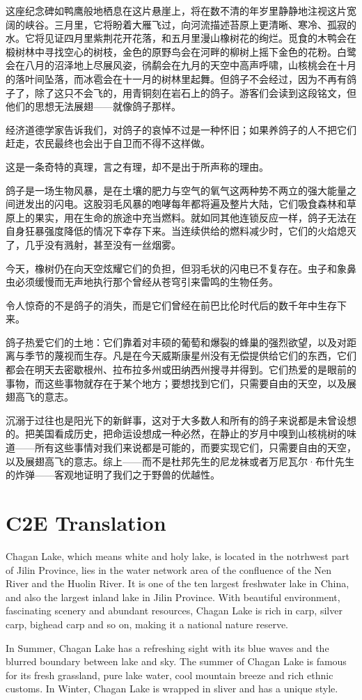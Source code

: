 \documentclass[8pt]{article}
\begin{document}
	这座纪念碑如鸭鹰般地栖息在这片悬崖上，将在数不清的年岁里静静地注视这片宽阔的峡谷。三月里，它将盼着大雁飞过，向河流描述苔原上更清晰、寒冷、孤寂的水。它将见证四月里紫荆花开花落，和五月里漫山橡树花的绚烂。觅食的木鸭会在椴树林中寻找空心的树枝，金色的原野鸟会在河畔的柳树上摇下金色的花粉。白鹭会在八月的沼泽地上尽展风姿，鸻鹬会在九月的天空中高声呼啸，山核桃会在十月的落叶间坠落，而冰雹会在十一月的树林里起舞。但鸽子不会经过，因为不再有鸽子了，除了这只不会飞的，用青铜刻在岩石上的鸽子。游客们会读到这段铭文，但他们的思想无法展翅——就像鸽子那样。

	经济道德学家告诉我们，对鸽子的哀悼不过是一种怀旧；如果养鸽子的人不把它们赶走，农民最终也会出于自卫而不得不这样做。
	
	这是一条奇特的真理，言之有理，却不是出于所声称的理由。

	鸽子是一场生物风暴，是在土壤的肥力与空气的氧气这两种势不两立的强大能量之间迸发出的闪电。这股羽毛风暴的咆哮每年都将遍及整片大陆，它们吸食森林和草原上的果实，用在生命的旅途中充当燃料。就如同其他连锁反应一样，鸽子无法在自身狂暴强度降低的情况下幸存下来。当连续供给的燃料减少时，它们的火焰熄灭了，几乎没有溅射，甚至没有一丝烟雾。

	今天，橡树仍在向天空炫耀它们的负担，但羽毛状的闪电已不复存在。虫子和象鼻虫必须缓慢而无声地执行那个曾经从苍穹引来雷鸣的生物任务。

	令人惊奇的不是鸽子的消失，而是它们曾经在前巴比伦时代后的数千年中生存下来。

	鸽子热爱它们的土地：它们靠着对丰硕的葡萄和爆裂的蜂巢的强烈欲望，以及对距离与季节的蔑视而生存。凡是在今天威斯康星州没有无偿提供给它们的东西，它们都会在明天去密歇根州、拉布拉多州或田纳西州搜寻并得到。它们热爱的是眼前的事物，而这些事物就存在于某个地方；要想找到它们，只需要自由的天空，以及展翅高飞的意志。

	沉溺于过往也是阳光下的新鲜事，这对于大多数人和所有的鸽子来说都是未曾设想的。把美国看成历史，把命运设想成一种必然，在静止的岁月中嗅到山核桃树的味道——所有这些事情对我们来说都是可能的，而要实现它们，只需要自由的天空，以及展翅高飞的意志。综上——而不是杜邦先生的尼龙袜或者万尼瓦尔·布什先生的炸弹——客观地证明了我们之于野兽的优越性。

\section{C2E Translation}

	Chagan Lake, which means white and holy lake, is located in the notrhwest part of Jilin Province, lies in the water network area of the confluence of the Nen River and the Huolin River. It is one of the ten largest freshwater lake in China, and also the largest inland lake in Jilin Province. With beautiful environment, fascinating scenery and abundant resources, Chagan Lake is rich in carp, silver carp, bighead carp and so on, making it a national nature reserve.

	In Summer, Chagan Lake has a refreshing sight with its blue waves and the blurred boundary between lake and sky. The summer of Chagan Lake is famous for its fresh grassland, pure lake water, cool mountain breeze and rich ethnic customs. In Winter, Chagan Lake is wrapped in sliver and has a unique style.
\end{document}
